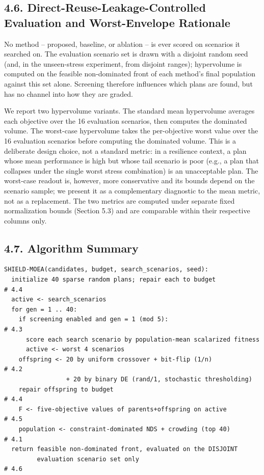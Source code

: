 \documentclass[
  10pt,
  a4paper,
]{article}
\begin{document}
\subsection{4.6. Direct-Reuse-Leakage-Controlled Evaluation and
Worst-Envelope
Rationale}\label{direct-reuse-leakage-controlled-evaluation-and-worst-envelope-rationale}

No method -- proposed, baseline, or ablation -- is ever scored on
scenarios it searched on. The evaluation scenario set is drawn with a
disjoint random seed (and, in the unseen-stress experiment, from
disjoint ranges); hypervolume is computed on the feasible non-dominated
front of each method's final population against this set alone.
Screening therefore influences which plans are found, but has no channel
into how they are graded.

We report two hypervolume variants. The standard mean hypervolume
averages each objective over the 16 evaluation scenarios, then computes
the dominated volume. The worst-case hypervolume takes the per-objective
worst value over the 16 evaluation scenarios before computing the
dominated volume. This is a deliberate design choice, not a standard
metric: in a resilience context, a plan whose mean performance is high
but whose tail scenario is poor (e.g., a plan that collapses under the
single worst stress combination) is an unacceptable plan. The worst-case
readout is, however, more conservative and its bounds depend on the
scenario sample; we present it as a complementary diagnostic to the mean
metric, not as a replacement. The two metrics are computed under
separate fixed normalization bounds (Section 5.3) and are comparable
within their respective columns only.

\subsection{4.7. Algorithm Summary}\label{algorithm-summary}

\begin{verbatim}
SHIELD-MOEA(candidates, budget, search_scenarios, seed):
  initialize 40 sparse random plans; repair each to budget            # 4.4
  active <- search_scenarios
  for gen = 1 .. 40:
    if screening enabled and gen = 1 (mod 5):                         # 4.3
      score each search scenario by population-mean scalarized fitness
      active <- worst 4 scenarios
    offspring <- 20 by uniform crossover + bit-flip (1/n)             # 4.2
                 + 20 by binary DE (rand/1, stochastic thresholding)
    repair offspring to budget                                        # 4.4
    F <- five-objective values of parents+offspring on active         # 4.5
    population <- constraint-dominated NDS + crowding (top 40)        # 4.1
  return feasible non-dominated front, evaluated on the DISJOINT
         evaluation scenario set only                                 # 4.6
\end{verbatim}
\end{document}

